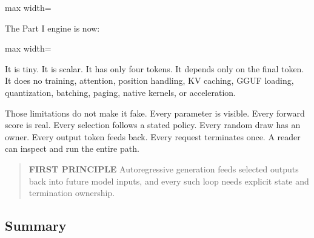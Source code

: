 \documentclass[
  10pt,
]{article}
\begin{document}
\begin{center}\begin{adjustbox}{max width=\linewidth}\end{adjustbox}\end{center}

The Part I engine is now:

\begin{center}\begin{adjustbox}{max width=\linewidth}\end{adjustbox}\end{center}

It is tiny. It is scalar. It has only four tokens. It depends only on
the final token. It does no training, attention, position handling, KV
caching, GGUF loading, quantization, batching, paging, native kernels,
or acceleration.

Those limitations do not make it fake. Every parameter is visible. Every
forward score is real. Every selection follows a stated policy. Every
random draw has an owner. Every output token feeds back. Every request
terminates once. A reader can inspect and run the entire path.

\begin{quote}
\textbf{FIRST PRINCIPLE} Autoregressive generation feeds selected
outputs back into future model inputs, and every such loop needs
explicit state and termination ownership.
\end{quote}

\subsection{Summary}\label{summary-3}
\end{document}

